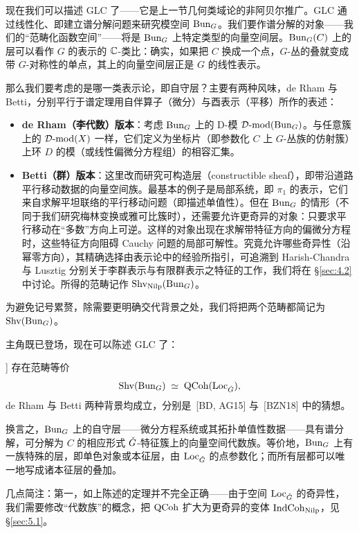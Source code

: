 现在我们可以描述 GLC 了——它是上一节几何类域论的非阿贝尔推广。GLC 通过线性化、即建立谱分解问题来研究模空间 $\operatorname{Bun}_{G}$。我们要作谱分解的对象——我们的“范畴化函数空间”——将是 $\operatorname{Bun}_{G}$ 上特定类型的向量空间层。$\operatorname{Bun}_{G}(C)$ 上的层可以看作 $G$ 的表示的 $\mathbb{C}$-类比：确实，如果把 $C$ 换成一个点，$G$-丛的叠就变成带 $G$-对称性的单点，其上的向量空间层正是 $G$ 的线性表示。

那么我们要考虑的是哪一类表示论，即自守层？主要有两种风味，de Rham 与 Betti，分别平行于谱定理用自伴算子（微分）与酉表示（平移）所作的表述：

\begin{itemize}
\item \textbf{de Rham（李代数）版本}：考虑 $\operatorname{Bun}_{G}$ 上的 D-模 $\mathcal{D}\text{-}\mathrm{mod}(\operatorname{Bun}_{G})$。与任意簇上的 $\mathcal{D}\text{-}\mathrm{mod}(X)$ 一样，它们定义为坐标片（即参数化 $C$ 上 $G$-丛族的仿射簇）上环 $D$ 的模（或线性偏微分方程组）的相容汇集。
\item \textbf{Betti（群）版本}：这里改而研究可构造层（constructible sheaf），即带沿道路平行移动数据的向量空间族。最基本的例子是局部系统，即 $\pi_{1}$ 的表示，它们来自求解平坦联络的平行移动问题（即描述单值性）。但在 $\operatorname{Bun}_{G}$ 的情形（不同于我们研究梅林变换或雅可比簇时），还需要允许更奇异的对象：只要求平行移动在“多数”方向上可逆。这样的对象出现在求解带特征方向的偏微分方程时，这些特征方向阻碍 Cauchy 问题的局部可解性。究竟允许哪些奇异性（沿幂零方向），其精确选择由表示论中的经验所指引，可追溯到 Harish-Chandra 与 Lusztig 分别关于李群表示与有限群表示之特征的工作，我们将在 \S\ref{sec:4.2} 中讨论。所得的范畴记作 $\operatorname{Shv}_{\operatorname{Nilp}}(\operatorname{Bun}_{G})$。
\end{itemize}

为避免记号累赘，除需要更明确交代背景之处，我们将把两个范畴都简记为 $\operatorname{Shv}(\operatorname{Bun}_{G})$。

主角既已登场，现在可以陈述 GLC 了：

\begin{theorem*}[GLC，[GR24a, ABC+24b, CCF+24, ABC+24a, GR24b]]\label{thm:glc}
存在范畴等价
\[
\operatorname{Shv}(\operatorname{Bun}_{G})\;\simeq\;\operatorname{QCoh}(\operatorname{Loc}_{\check{G}}),
\]
de Rham 与 Betti 两种背景均成立，分别是~[BD, AG15] 与~[BZN18] 中的猜想。
\end{theorem*}

换言之，$\operatorname{Bun}_{G}$ 上的自守层——微分方程系统或其拓扑单值性数据——具有谱分解，可分解为 $C$ 的相应形式 $\check{G}$-特征簇上的向量空间代数族。等价地，$\operatorname{Bun}_{G}$ 上有一族特殊的层，即单色对象或本征层，由 $\operatorname{Loc}_{\check{G}}$ 的点参数化；而所有层都可以唯一地写成诸本征层的叠加。

几点简注：第一，如上陈述的定理并不完全正确——由于空间 $\operatorname{Loc}_{\check{G}}$ 的奇异性，我们需要修改“代数族”的概念，把 $\operatorname{QCoh}$ 扩大为更奇异的变体 $\operatorname{IndCoh}_{\operatorname{Nilp}}$，见 \S\ref{sec:5.1}。

